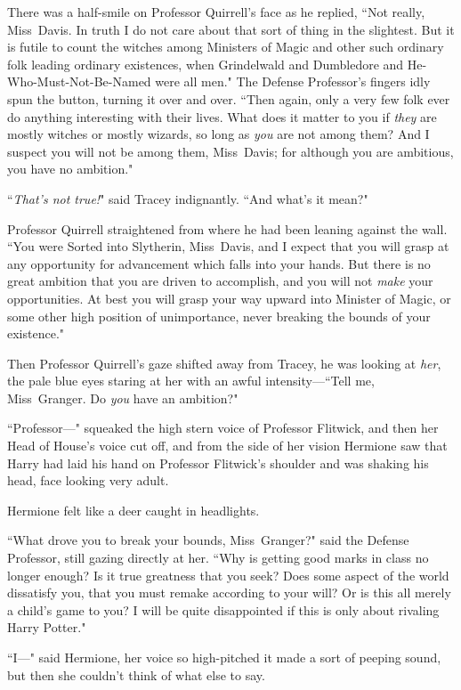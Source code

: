 There was a half-smile on Professor Quirrell's face as he replied, ``Not really, Miss~Davis. In truth I do not care about that sort of thing in the slightest. But it is futile to count the witches among Ministers of Magic and other such ordinary folk leading ordinary existences, when Grindelwald and Dumbledore and He-Who-Must-Not-Be-Named were all men." The Defense Professor's fingers idly spun the button, turning it over and over. ``Then again, only a very few folk ever do anything interesting with their lives. What does it matter to you if \emph{they} are mostly witches or mostly wizards, so long as \emph{you} are not among them? And I suspect you will not be among them, Miss~Davis; for although you are ambitious, you have no ambition."

``\emph{That's not true!}" said Tracey indignantly. ``And what's it mean?"

Professor Quirrell straightened from where he had been leaning against the wall. ``You were Sorted into Slytherin, Miss~Davis, and I expect that you will grasp at any opportunity for advancement which falls into your hands. But there is no great ambition that you are driven to accomplish, and you will not \emph{make} your opportunities. At best you will grasp your way upward into Minister of Magic, or some other high position of unimportance, never breaking the bounds of your existence."

Then Professor Quirrell's gaze shifted away from Tracey, he was looking at \emph{her}, the pale blue eyes staring at her with an awful intensity---``Tell me, Miss~Granger. Do \emph{you} have an ambition?"

``Professor---" squeaked the high stern voice of Professor Flitwick, and then her Head of House's voice cut off, and from the side of her vision Hermione saw that Harry had laid his hand on Professor Flitwick's shoulder and was shaking his head, face looking very adult.

Hermione felt like a deer caught in headlights.

``What drove you to break your bounds, Miss~Granger?" said the Defense Professor, still gazing directly at her. ``Why is getting good marks in class no longer enough? Is it true greatness that you seek? Does some aspect of the world dissatisfy you, that you must remake according to your will? Or is this all merely a child's game to you? I will be quite disappointed if this is only about rivaling Harry Potter."

``I---" said Hermione, her voice so high-pitched it made a sort of peeping sound, but then she couldn't think of what else to say.

